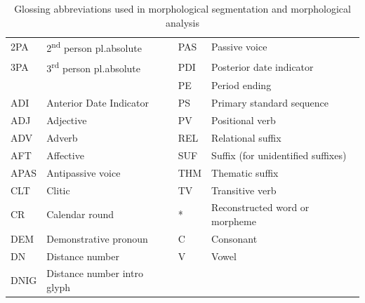 \documentclass[../main.tex]{subfiles}
\begin{document}
\begin{table}[!ht]
\begin{tabular}{llll}
        2PA            & 2\textsuperscript{nd} person pl.absolute         & PAS            & Passive voice \\                        
        3PA            & 3\textsuperscript{rd} person pl.absolute         & PDI            & Posterior date indicator \\
                       &                                                  & PE             & Period ending \\
        ADI            & Anterior Date Indicator                          & PS             & Primary standard sequence \\
        ADJ            & Adjective                                        & PV             & Positional verb \\         
        ADV            & Adverb                                           & REL            & Relational suffix \\             
        AFT            & Affective                                        & SUF            & Suffix (for unidentified suffixes) \\
        APAS           & Antipassive voice                                & THM            & Thematic suffix \\        
        CLT            & Clitic                                           & TV             & Transitive verb \\     
        CR             & Calendar round                                   & *              & Reconstructed word or morpheme \\
        DEM            & Demonstrative pronoun                            & C              & Consonant \\
        DN             & Distance number                                  & V              & Vowel \\
        DNIG           & Distance number intro glyph                      
    \end{tabular} 
    \caption{Glossing abbreviations used in morphological segmentation and morphological analysis}
    \label{table:terminology-glossing-abbreviations}
\end{table}
\end{document}
